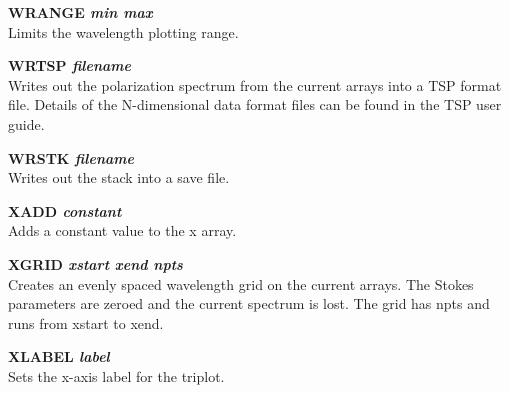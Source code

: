 {\bf WRANGE \it min max } \\
Limits the wavelength plotting range.

{\bf WRTSP \it filename } \\
Writes out the polarization spectrum from the current arrays into a  TSP
format file. Details of the N-dimensional data format files can
be found in the  TSP user guide.

{\bf WRSTK \it filename } \\
Writes out the stack into a save file.

{\bf XADD \it constant} \\
Adds a constant value to the x array.

{\bf XGRID \it xstart xend npts} \\
Creates an evenly spaced wavelength grid on the current arrays. The Stokes
parameters are zeroed and the current spectrum is lost. The grid has npts and
runs from xstart to xend.

{\bf XLABEL \it label} \\
Sets the x-axis label for the triplot.

 

